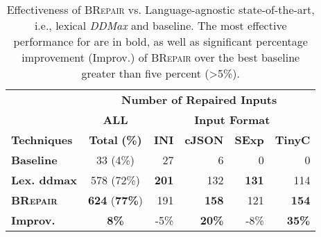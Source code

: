\documentclass[sigconf,review,anonymous]{acmart}
\newcommand{\approach}{\textsc{BRepair}\xspace}
\newcommand{\ddmax}{\textit{DDMax}\xspace}
\begin{document}
\begin{table}[!tbp]\centering
\caption{Effectiveness of \approach vs. Language-agnostic state-of-the-art, i.e., lexical \ddmax and  baseline.  The most effective performance for are in bold, as well as significant percentage improvement (Improv.) of \approach over the best baseline greater than five percent (>5\%). }
\begin{tabular}{|l | c | r  r  r  r |}
\hline
&  \multicolumn{5}{c|}{\textbf{Number of Repaired Inputs}}  \\
&  \multicolumn{1}{c|}{\textbf{ALL}} & \multicolumn{4}{c|}{\textbf{Input Format}}  \\
\textbf{Techniques} & \textbf{Total} \textbf{(\%)} & \textbf{INI} & \textbf{cJSON} & \textbf{SExp} & \textbf{TinyC} \\
\hline
\textbf{Baseline}   & 33 (4\%) & 27	 & 6 &	0	& 0\\
\textbf{Lex. ddmax} & 578 (72\%) & \textbf{201}  & 132  & \textbf{131} & 114  \\ 		
\hline	
\textbf{\approach}  & \textbf{624} (\textbf{77\%}) & 191 & \textbf{158}  & 121  & \textbf{154} \\
\hline
\textbf{Improv.} &  \textbf{8\%}  & -5\% & \textbf{20\%} & -8\% & \textbf{35\%} \\
\hline
\end{tabular}
\label{tab:effectiveness-no-grammar}
\end{table}
\end{document}
